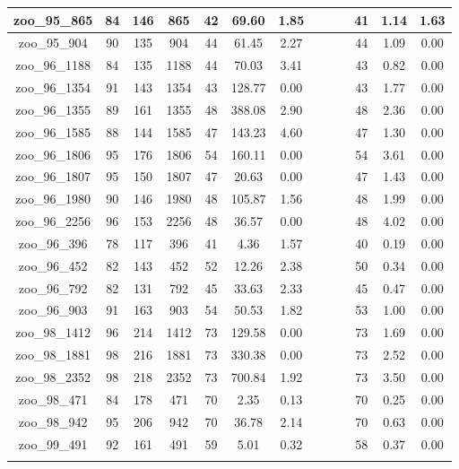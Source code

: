 \begin{landscape}
\begin{longtable}{|c|c|c|c|c|c|c|c|c|c|c|c|c|}
zoo\_95\_865 & 84 & 146 & 865 & 42 & 69.60 & 1.85 &  &  &  & 41 & 1.14 & 1.63 \\ \hline 
zoo\_95\_904 & 90 & 135 & 904 & 44 & 61.45 & 2.27 &  &  &  & 44 & 1.09 & 0.00 \\ \hline 
zoo\_96\_1188 & 84 & 135 & 1188 & 44 & 70.03 & 3.41 &  &  &  & 43 & 0.82 & 0.00 \\ \hline 
zoo\_96\_1354 & 91 & 143 & 1354 & 43 & 128.77 & 0.00 &  &  &  & 43 & 1.77 & 0.00 \\ \hline 
zoo\_96\_1355 & 89 & 161 & 1355 & 48 & 388.08 & 2.90 &  &  &  & 48 & 2.36 & 0.00 \\ \hline 
zoo\_96\_1585 & 88 & 144 & 1585 & 47 & 143.23 & 4.60 &  &  &  & 47 & 1.30 & 0.00 \\ \hline 
zoo\_96\_1806 & 95 & 176 & 1806 & 54 & 160.11 & 0.00 &  &  &  & 54 & 3.61 & 0.00 \\ \hline 
zoo\_96\_1807 & 95 & 150 & 1807 & 47 & 20.63 & 0.00 &  &  &  & 47 & 1.43 & 0.00 \\ \hline 
zoo\_96\_1980 & 90 & 146 & 1980 & 48 & 105.87 & 1.56 &  &  &  & 48 & 1.99 & 0.00 \\ \hline 
zoo\_96\_2256 & 96 & 153 & 2256 & 48 & 36.57 & 0.00 &  &  &  & 48 & 4.02 & 0.00 \\ \hline 
zoo\_96\_396 & 78 & 117 & 396 & 41 & 4.36 & 1.57 &  &  &  & 40 & 0.19 & 0.00 \\ \hline 
zoo\_96\_452 & 82 & 143 & 452 & 52 & 12.26 & 2.38 &  &  &  & 50 & 0.34 & 0.00 \\ \hline 
zoo\_96\_792 & 82 & 131 & 792 & 45 & 33.63 & 2.33 &  &  &  & 45 & 0.47 & 0.00 \\ \hline 
zoo\_96\_903 & 91 & 163 & 903 & 54 & 50.53 & 1.82 &  &  &  & 53 & 1.00 & 0.00 \\ \hline 
zoo\_98\_1412 & 96 & 214 & 1412 & 73 & 129.58 & 0.00 &  &  &  & 73 & 1.69 & 0.00 \\ \hline 
zoo\_98\_1881 & 98 & 216 & 1881 & 73 & 330.38 & 0.00 &  &  &  & 73 & 2.52 & 0.00 \\ \hline 
zoo\_98\_2352 & 98 & 218 & 2352 & 73 & 700.84 & 1.92 &  &  &  & 73 & 3.50 & 0.00 \\ \hline 
zoo\_98\_471 & 84 & 178 & 471 & 70 & 2.35 & 0.13 &  &  &  & 70 & 0.25 & 0.00 \\ \hline 
zoo\_98\_942 & 95 & 206 & 942 & 70 & 36.78 & 2.14 &  &  &  & 70 & 0.63 & 0.00 \\ \hline 
zoo\_99\_491 & 92 & 161 & 491 & 59 & 5.01 & 0.32 &  &  &  & 58 & 0.37 & 0.00 \\ \hline 
\label{tbl:results}
\end{longtable}
\end{landscape}
